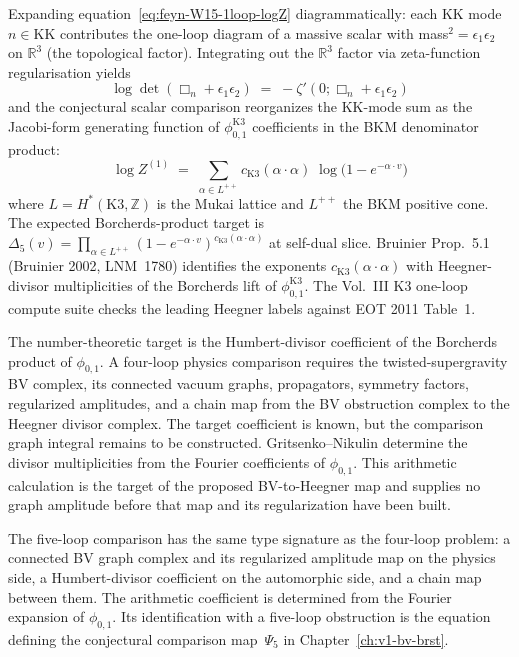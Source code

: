 \begin{remark}
\label{rem:feyn-W15-explicit-diagram}
Expanding equation~\eqref{eq:feyn-W15-1loop-logZ} diagrammatically:
each KK mode $n \in \mathrm{KK}$ contributes the one-loop diagram of a
massive scalar with mass$^2 = \epsilon_1\epsilon_2$ on
$\mathbb R^3$ (the topological factor). Integrating out the $\mathbb R^3$
factor via zeta-function regularisation yields
\[
\log\det(\Box_n + \epsilon_1\epsilon_2)
 \;=\; -\zeta'(0; \Box_n + \epsilon_1\epsilon_2)
\]
and the conjectural scalar comparison reorganizes the KK-mode sum as
the Jacobi-form generating function of $\phi_{0,1}^{\mathrm K3}$
coefficients in the BKM denominator product:
\[
\log Z^{(1)}
 \;=\; \sum_{\alpha \in L^{++}}
 c_{\mathrm K3}(\alpha\cdot\alpha)\;
 \log\bigl(1 - e^{-\alpha \cdot v}\bigr)
\]
where $L = H^*(\mathrm{K3}, \mathbb Z)$ is the Mukai lattice and
$L^{++}$ the BKM positive cone. The expected Borcherds-product target is
$\Delta_5(v) = \prod_{\alpha \in L^{++}}
(1 - e^{-\alpha\cdot v})^{c_{\mathrm K3}(\alpha\cdot\alpha)}$ at
self-dual slice. Bruinier Prop.~5.1 (Bruinier 2002, LNM~1780) identifies
the exponents $c_{\mathrm K3}(\alpha\cdot\alpha)$ with Heegner-divisor
multiplicities of the Borcherds lift of $\phi_{0,1}^{\mathrm K3}$.
The Vol.~III K3 one-loop compute suite checks the leading Heegner
labels against EOT 2011 Table~1.
\end{remark}

\begin{remark}
\label{rem:feyn-4loop-explicit-expansion}
The number-theoretic target is the Humbert-divisor coefficient of the
Borcherds product of $\phi_{0,1}$.  A four-loop physics comparison
requires the twisted-supergravity BV complex, its connected vacuum
graphs, propagators, symmetry factors, regularized amplitudes, and a
chain map from the BV obstruction complex to the Heegner divisor
complex.  The target coefficient is known, but the comparison graph
integral remains to be constructed.
Gritsenko--Nikulin determine the divisor multiplicities from the
Fourier coefficients of $\phi_{0,1}$.  This arithmetic calculation is
the target of the proposed BV-to-Heegner map and supplies no graph
amplitude before that map and its regularization have been built.
\end{remark}

\begin{remark}
\label{rem:feyn-5loop-companion}
The five-loop comparison has the same type signature as the
four-loop problem: a connected BV graph complex and its regularized
amplitude map on the physics side, a Humbert-divisor coefficient on
the automorphic side, and a chain map between them.  The arithmetic
coefficient is determined from the Fourier expansion of
$\phi_{0,1}$.  Its identification with a five-loop obstruction is the
equation defining the conjectural comparison map~$\Psi_5$ in
Chapter~\ref{ch:v1-bv-brst}.
\end{remark}

